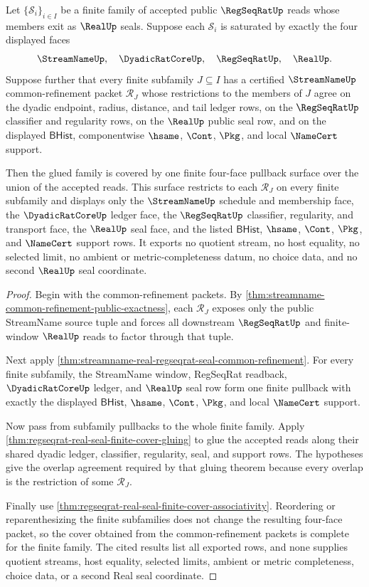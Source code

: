 \begin{theorem}
\label{thm:regseqrat-real-seal-common-refinement-cover-completeness}
Let $\{\mathcal{S}_i\}_{i\in I}$ be a finite family of accepted public
$\RegSeqRatUp$ reads whose members exit as $\RealUp$ seals. Suppose each
$\mathcal{S}_i$ is saturated by exactly the four displayed faces
$$
\StreamNameUp,\quad \DyadicRatCoreUp,\quad \RegSeqRatUp,\quad \RealUp.
$$
Suppose further that every finite subfamily $J\subseteq I$ has a certified
$\StreamNameUp$ common-refinement packet $\mathcal{R}_J$ whose restrictions to
the members of $J$ agree on the dyadic endpoint, radius, distance, and tail
ledger rows, on the $\RegSeqRatUp$ classifier and regularity rows, on the
$\RealUp$ public seal row, and on the displayed $\mathsf{BHist}$,
componentwise $\hsame$, $\Cont$, $\Pkg$, and local $\NameCert$ support.

Then the glued family is covered by one finite four-face pullback surface over
the union of the accepted reads. This surface restricts to each
$\mathcal{R}_J$ on every finite subfamily and displays only the
$\StreamNameUp$ schedule and membership face, the $\DyadicRatCoreUp$ ledger
face, the $\RegSeqRatUp$ classifier, regularity, and transport face, the
$\RealUp$ seal face, and the listed $\mathsf{BHist}$, $\hsame$, $\Cont$,
$\Pkg$, and $\NameCert$ support rows. It exports no quotient stream, no host
equality, no selected limit, no ambient or metric-completeness datum, no choice
data, and no second $\RealUp$ seal coordinate.
\end{theorem}
\begin{proof}
Begin with the common-refinement packets. By
\autoref{thm:streamname-common-refinement-public-exactness}, each
$\mathcal{R}_J$ exposes only the public StreamName source tuple and forces all
downstream $\RegSeqRatUp$ and finite-window $\RealUp$ reads to factor through
that tuple.

Next apply
\autoref{thm:streamname-real-regseqrat-seal-common-refinement}. For every
finite subfamily, the StreamName window, RegSeqRat readback,
$\DyadicRatCoreUp$ ledger, and $\RealUp$ seal row form one finite pullback
with exactly the displayed $\mathsf{BHist}$, $\hsame$, $\Cont$, $\Pkg$, and
local $\NameCert$ support.

Now pass from subfamily pullbacks to the whole finite family. Apply
\autoref{thm:regseqrat-real-seal-finite-cover-gluing} to glue the accepted
reads along their shared dyadic ledger, classifier, regularity, seal, and
support rows. The hypotheses give the overlap agreement required by that
gluing theorem because every overlap is the restriction of some
$\mathcal{R}_J$.

Finally use
\autoref{thm:regseqrat-real-seal-finite-cover-associativity}. Reordering or
reparenthesizing the finite subfamilies does not change the resulting
four-face packet, so the cover obtained from the common-refinement packets is
complete for the finite family. The cited results list all exported rows, and
none supplies quotient streams, host equality, selected limits, ambient or
metric completeness, choice data, or a second Real seal coordinate.
\end{proof}

